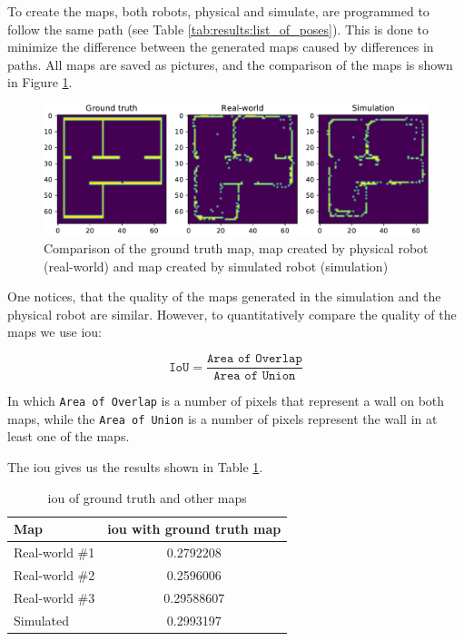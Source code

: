 To create the maps, both robots, physical and simulate, are programmed to follow the same path (see Table \ref{tab:results:list_of_poses}).
This is done to minimize the difference between the generated maps caused by differences in paths.
All maps are saved as pictures, and the comparison of the maps is shown in Figure \ref{fig:results:map_comparison}.

\begin{figure}[H]
    \centering
    \includegraphics[width=\textwidth]{./results/figures/map_comparison.pdf}
    \caption{Comparison of the ground truth map, map created by physical robot (real-world) and map created by simulated robot (simulation)}
    \label{fig:results:map_comparison}
\end{figure}

One notices, that the quality of the maps generated in the simulation and the physical robot are similar.
However, to quantitatively compare the quality of the maps we use \ac{iou}:

\begin{equation}
    \texttt{IoU} = \frac{\texttt{Area of Overlap}}{\texttt{Area of Union}}
\end{equation}

In which \texttt{Area of Overlap} is a number of pixels that represent a wall on both maps, while the \texttt{Area of Union} is a number of pixels represent the wall in at least one of the maps.

The \ac{iou} gives us the results shown in Table \ref{tab:results:map_iou}.

\begin{table}[H]
    \centering
    \begin{tabular}{|l|c|}
        \hline
        \textbf{Map} & \textbf{\acs{iou} with ground truth map} \\
        \hline
        Real-world \#1 & 0.2792208 \\
        \hline
        Real-world \#2 & 0.2596006 \\
        \hline
        Real-world \#3 & 0.29588607 \\
        \hline
        Simulated & 0.2993197 \\
        \hline
    \end{tabular}
    \caption{\ac{iou} of ground truth and other maps}
    \label{tab:results:map_iou}
\end{table}

